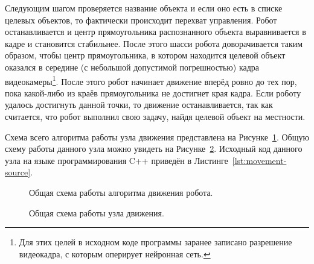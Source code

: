 Следующим шагом проверяется название объекта и если оно есть в списке целевых объектов, то фактически происходит перехват управления. Робот останавливается и центр прямоугольника распознанного объекта выравнивается в кадре и становится стабильнее. После этого шасси робота доворачивается таким образом, чтобы центр прямоугольника, в котором находится целевой объект оказался в середине (с небольшой допустимой погрешностью) кадра видеокамеры\footnote{Для этих целей в исходном коде программы заранее записано разрешение видеокадра, с которым оперирует нейронная сеть.}. После этого робот начинает движение вперёд ровно до тех пор, пока какой-либо из краёв прямоугольника не достигнет края кадра. Если роботу удалось достигнуть данной точки, то движение останавливается, так как считается, что робот выполнил свою задачу, найдя целевой объект на местности. 

Схема всего алгоритма работы узла движения представлена на Рисунке~\ref{fig:algorithm-robot}. Общую схему работы данного узла можно увидеть на Рисунке~\ref{fig:node-movement}. Исходный код данного узла на языке программирования C++ приведён в Листинге~\ref{lst:movement-source}.

\begin{figure}[ht]
  \caption{Общая схема работы алгоритма движения робота.}\label{fig:algorithm-robot}
\end{figure}

\begin{figure}[ht]
  \caption{Общая схема работы узла движения.}\label{fig:node-movement}
\end{figure}

\clearpage
